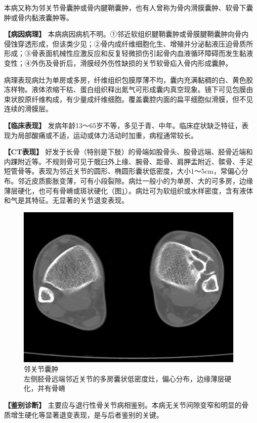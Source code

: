 本病又称为邻关节骨囊肿或骨内腱鞘囊肿，也有人曾称为骨内滑膜囊肿、软骨下囊肿或骨内黏液囊肿等。

\textbf{【病因病理】}
本病病因病机不明。①邻近软组织腱鞘囊肿或骨膜腱鞘囊肿向骨内侵蚀穿透形成，但该类少见；②骨内成纤维细胞化生、增殖并分泌黏液压迫骨质所形成；③骨表面机械性应激反应和反复轻微损伤引起骨内血液循环障碍而发生黏液变性；④外伤及骨折后，滑膜经外伤性缺损的关节软骨疝入骨内形成囊肿。

病理表现病灶为单房或多房，纤维组织包膜厚薄不均，囊内充满黏稠的白、黄色胶冻样物。液体浓缩干枯、蛋白组织释出氮气可形成囊内真空现象。镜下可见包膜由束状胶原纤维构成，有少量成纤维细胞。覆盖囊腔内面的扁平细胞似滑膜，但不见连续的滑膜层。

\textbf{【临床表现】}
发病年龄13～65岁不等，多见于青、中年。临床症状缺乏特征，表现为局部酸痛或不适，运动或体力活动时加重，病程通常较长。

\textbf{【CT表现】}
好发于长骨（特别是下肢）的骨端如股骨头、股骨远端、胫骨近端和内踝附近等。不规则骨可见于髋臼外上缘、腕骨、距骨、肩胛盂附近、髌骨、手足短管骨等。表现为邻近关节的圆形、椭圆形囊状低密度，大小1～5cm，常偏心分布。邻近皮质膨胀变薄，可有小段裂隙。病灶一般小的为单房、大的可多房，边缘薄层硬化，也可有骨嵴或斑状硬化（图\ref{fig22-34}）。病灶可为软组织或水样密度，含有液体和气是其特征。无显著的关节退变表现。

\begin{figure}[!htbp]
 \centering
 \includegraphics[width=.7\textwidth,height=\textheight,keepaspectratio]{./images/Image00460.jpg}
 \captionsetup{justification=centering}
 \caption{邻关节囊肿\\{\small 左侧胫骨远端邻近关节的多房囊状低密度灶，偏心分布，边缘薄层硬化，并有骨嵴}}
 \label{fig22-34}
  \end{figure} 

\textbf{【鉴别诊断】}
主要应与退行性骨关节病相鉴别。本病无关节间隙变窄和明显的骨质增生硬化等显著退变表现，是与后者鉴别的关键。

